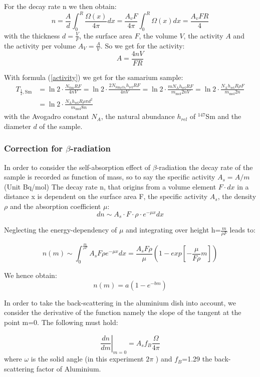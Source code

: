 \documentclass[12pt]{article}
\begin{document}
For the decay rate n we then obtain:
\[n= \frac{A}{d}\int_{0}^{R}\frac{\Omega(x)}{4\pi}dx = \frac{A_v F}{4\pi}\int_{0}^{R}\Omega(x)dx = \frac{A_v F R}{4}\]
with the thickness $d=\frac{V}{F}$, the surface area $F$, the volume $V$, the activity $A$ and the activity per volume $A_V=\frac{A}{V}$. So we get for the activity:
$$A=\frac{4nV}{FR}$$

With formula (\ref{activity}) we get for the samarium sample:
\begin{align}
	T_{\frac12,\text{Sm}}&=\ln2\cdot\frac{N_{\text{Sm}}RF}{4nV}=\ln2\cdot\frac{2N_{\text{Sm$_2$O$_3$}}h_{\text{rel}}RF}{4nV}=\ln2\cdot\frac{mN_{\text{A}}h_{\text{rel}}RF}{m_{\text{mol}}2nV}
	=\ln2\cdot\frac{N_{\text{A}}h_{\text{rel}}R\rho F}{m_{\text{mol}}2n}\\&
	 =\ln2\cdot\frac{N_{\text{A}}h_{\text{rel}}R\rho\pi d^2}{m_{\text{mol}}8n}\label{halflifeSm}
\end{align}
with the Avogadro constant $N_A$, the natural abundance $h_{rel}$ of $^{147}$Sm and the diameter $d$ of the sample.

\subsubsection{Correction for $\beta$-radiation}\label{betacorrection}

In order to consider the self-absorption effect of $\beta$-radiation the decay rate of the sample is recorded as function of mass, so to say the specific activity  $A_s=A/m$ (Unit Bq/mol)
The decay rate n, that origins from a volume element $F\cdot dx$ in a distance x is dependent on the surface area F, the specific activity $A_s$, the density $\rho$ and the absorption coefficient  $\mu$:  
\[dn\sim A_s\cdot F\cdot \rho\cdot e^{-\mu x}dx\]

Neglecting the energy-dependency of $\mu$ and integrating over height  h=$\frac{m}{\rho F}$ leads to:

\[n(m)\sim\int_{0}^{\frac{m}{\rho F}}A_s F\rho e^{-\mu x}dx = \frac{A_s F\rho}{\mu}\left( 1-exp\left[ -\frac{\mu}{F\rho}m\right] \right)\]

We hence obtain:
\[n(m)= a\left( 1-e^{-bm}\right)\]

In order to take the back-scattering in the aluminium dish into account, we consider the derivative of the function namely the slope of the tangent at the point m=0. The following must hold: 

\[\left. \frac{dn}{dm}\right| _{m=0}=A_s f_B \frac{\Omega}{4\pi}\]
where $\omega$ is the solid angle (in this experiment $2\pi$ )  and $f_B$=1.29 the back-scattering factor of Aluminium.\\
\end{document}

